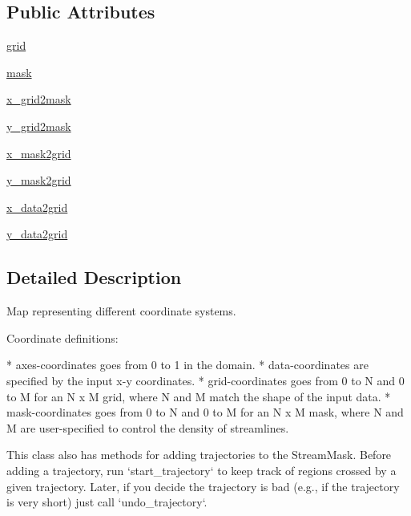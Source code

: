\subsection*{Public Attributes}
\begin{DoxyCompactItemize}
\item 
\hyperlink{classmatplotlib_1_1streamplot_1_1DomainMap_a50a523f858cbd2ebb6227242d5d788a7}{grid}
\item 
\hyperlink{classmatplotlib_1_1streamplot_1_1DomainMap_ada03814a04e3b9e77d2adc6768d16801}{mask}
\item 
\hyperlink{classmatplotlib_1_1streamplot_1_1DomainMap_a884de7078787444b8f76af4b15f6a69b}{x\+\_\+grid2mask}
\item 
\hyperlink{classmatplotlib_1_1streamplot_1_1DomainMap_a997aa780c68bb1863133f9f16a9aecdb}{y\+\_\+grid2mask}
\item 
\hyperlink{classmatplotlib_1_1streamplot_1_1DomainMap_a119e59e4c9e08e3b9726ecf703c369ba}{x\+\_\+mask2grid}
\item 
\hyperlink{classmatplotlib_1_1streamplot_1_1DomainMap_a3bc2a02209ad836c8fa4ba97d63e7cde}{y\+\_\+mask2grid}
\item 
\hyperlink{classmatplotlib_1_1streamplot_1_1DomainMap_ae4aef37e39c92a11fdd0d10f0d05d97d}{x\+\_\+data2grid}
\item 
\hyperlink{classmatplotlib_1_1streamplot_1_1DomainMap_ab13db5b7861d309e2294679c3c87303c}{y\+\_\+data2grid}
\end{DoxyCompactItemize}


\subsection{Detailed Description}
\begin{DoxyVerb}Map representing different coordinate systems.

Coordinate definitions:

* axes-coordinates goes from 0 to 1 in the domain.
* data-coordinates are specified by the input x-y coordinates.
* grid-coordinates goes from 0 to N and 0 to M for an N x M grid,
  where N and M match the shape of the input data.
* mask-coordinates goes from 0 to N and 0 to M for an N x M mask,
  where N and M are user-specified to control the density of streamlines.

This class also has methods for adding trajectories to the StreamMask.
Before adding a trajectory, run `start_trajectory` to keep track of regions
crossed by a given trajectory. Later, if you decide the trajectory is bad
(e.g., if the trajectory is very short) just call `undo_trajectory`.
\end{DoxyVerb}
 

